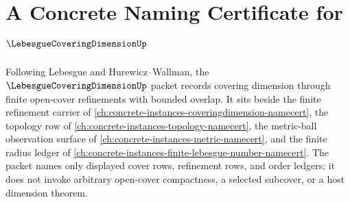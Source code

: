 \chapter{A Concrete Naming Certificate for $\LebesgueCoveringDimensionUp$}
\label{ch:concrete-instances-lebesgue-covering-dimension-namecert}

Following Lebesgue and Hurewicz--Wallman, the $\LebesgueCoveringDimensionUp$
packet records covering dimension through finite open-cover refinements with
bounded overlap. It sits beside the finite refinement carrier of
\autoref{ch:concrete-instances-coveringdimension-namecert}, the topology row of
\autoref{ch:concrete-instances-topology-namecert}, the metric-ball observation
surface of \autoref{ch:concrete-instances-metric-namecert}, and the finite
radius ledger of \autoref{ch:concrete-instances-finite-lebesgue-number-namecert}.
The packet names only displayed cover rows, refinement rows, and order ledgers;
it does not invoke arbitrary open-cover compactness, a selected subcover, or a
host dimension theorem.

